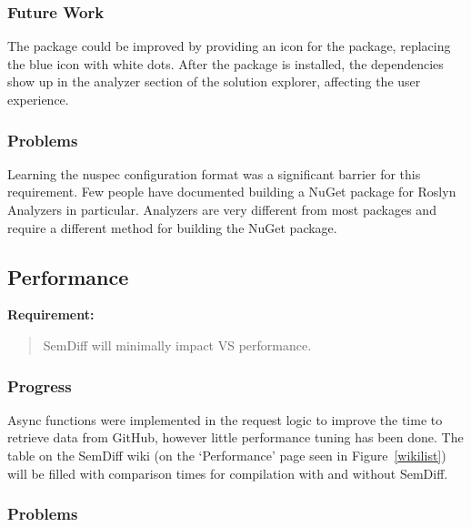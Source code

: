 \documentclass[draftclsnofoot,onecolumn]{IEEEtran}
\begin{document}
\subsubsection{Future Work}

The package could be improved by providing an icon for the package, replacing 
the blue icon with white dots. After the package is installed, the 
dependencies show up in the analyzer section of the solution explorer, 
affecting the user experience.

\subsubsection{Problems}

Learning the nuspec configuration format was a significant barrier for this 
requirement. Few people have documented building a NuGet package for Roslyn 
Analyzers in particular. Analyzers are very different from most packages and 
require a different method for building the NuGet package. 

\subsection{Performance}%

\textbf{Requirement:}

\begin{quote}

SemDiff will minimally impact VS performance.

\end{quote}

\subsubsection{Progress}

Async functions were implemented in the request logic to improve the time to 
retrieve data from GitHub, however little performance tuning has been done. 
The table on the SemDiff wiki (on the ‘Performance’ page seen in 
Figure~\ref{wikilist}) will be filled with comparison times for compilation 
with and without SemDiff. 

\subsubsection{Problems}
\end{document}
